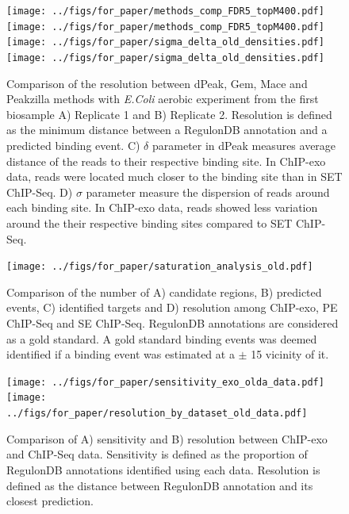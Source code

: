 \documentclass{bmcart}\usepackage[]{graphicx}\usepackage[]{color}
\newcommand{\sig}{\sigma^{70}}
\begin{document}
\newpage

\begin{figure}[h!]
  \centering
  \texttt{[image: ../figs/for\_paper/methods\_comp\_FDR5\_topM400.pdf]}
  \texttt{[image: ../figs/for\_paper/methods\_comp\_FDR5\_topM400.pdf]}
   \texttt{[image: ../figs/for\_paper/sigma\_delta\_old\_densities.pdf]}
   \texttt{[image: ../figs/for\_paper/sigma\_delta\_old\_densities.pdf]}   
  \caption{Comparison of the resolution between dPeak, Gem, Mace and
    Peakzilla methods with \emph{E.Coli} aerobic experiment from the
    first biosample A) Replicate 1 and B) Replicate 2. Resolution is
    defined as the minimum distance between a RegulonDB annotation and
    a predicted binding event. C) $\delta$ parameter in dPeak measures
    average distance of the reads to their respective binding site. In
    ChIP-exo data, reads were located much closer to the binding site
    than in SET ChIP-Seq. D) $\sigma$ parameter measure the dispersion
    of reads around each binding site. In ChIP-exo data, reads showed
    less variation around the their respective binding sites compared
    to SET ChIP-Seq.}
  \label{fig:methods_comp}
\end{figure}

\newpage

\begin{figure}[h]
  \centering
  \texttt{[image: ../figs/for\_paper/saturation\_analysis\_old.pdf]}
  \caption{Comparison of the number of A) candidate regions, B)
    predicted events, C) identified targets and D) resolution among
    ChIP-exo, PE ChIP-Seq and SE ChIP-Seq. RegulonDB annotations are
    considered as a gold standard. A gold standard binding events was
    deemed identified if a binding event was estimated at a $\pm$
    15 vicinity of it.}
  \label{fig:design}
\end{figure}




\newpage
\begin{figure}[h!]
  \centering
  \texttt{[image: ../figs/for\_paper/sensitivity\_exo\_olda\_data.pdf]}
  \texttt{[image: ../figs/for\_paper/resolution\_by\_dataset\_old\_data.pdf]}
  \caption{Comparison of A) sensitivity and B) resolution between
    ChIP-exo and ChIP-Seq data. Sensitivity is defined as the
    proportion of RegulonDB annotations identified using each
    data. Resolution is defined as the distance between RegulonDB
    annotation and its closest prediction.}
  \label{fig:reso_all}
\end{figure}
\end{document}
